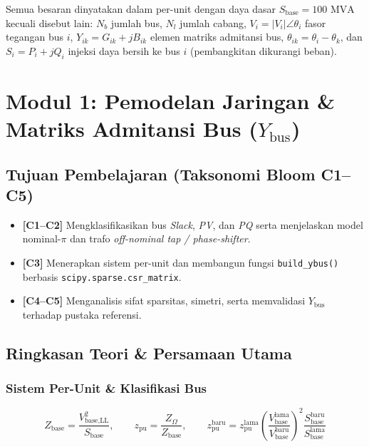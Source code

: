 \documentclass[11pt,a4paper]{report}
\begin{document}
\begin{catatanbox}
Semua besaran dinyatakan dalam per-unit dengan daya dasar $S_{\text{base}} = 100\text{ MVA}$ kecuali disebut lain: $N_b$ jumlah bus, $N_l$ jumlah cabang, $V_i = |V_i|\angle\theta_i$ fasor tegangan bus $i$, $Y_{ik} = G_{ik} + jB_{ik}$ elemen matriks admitansi bus, $\theta_{ik} = \theta_i - \theta_k$, dan $S_i = P_i + jQ_i$ injeksi daya bersih ke bus $i$ (pembangkitan dikurangi beban).
\end{catatanbox}

\chapter{Modul 1: Pemodelan Jaringan \& Matriks Admitansi Bus ($Y_{\text{bus}}$)}

\section{Tujuan Pembelajaran (Taksonomi Bloom C1--C5)}
\begin{itemize}[leftmargin=1.5em]
  \item \textbf{[C1--C2]} Mengklasifikasikan bus \textit{Slack}, \textit{PV}, dan \textit{PQ} serta menjelaskan model nominal-$\pi$ dan trafo \textit{off-nominal tap / phase-shifter}.
  \item \textbf{[C3]} Menerapkan sistem per-unit dan membangun fungsi \texttt{build\_ybus()} berbasis \texttt{scipy.sparse.csr\_matrix}.
  \item \textbf{[C4--C5]} Menganalisis sifat sparsitas, simetri, serta memvalidasi $Y_{\text{bus}}$ terhadap pustaka referensi.
\end{itemize}

\section{Ringkasan Teori \& Persamaan Utama}

\subsection{Sistem Per-Unit \& Klasifikasi Bus}
\begin{equation}
  Z_{\text{base}} = \frac{V_{\text{base,LL}}^2}{S_{\text{base}}}, \qquad
  z_{\text{pu}} = \frac{Z_{\Omega}}{Z_{\text{base}}}, \qquad
  z_{\text{pu}}^{\text{baru}} = z_{\text{pu}}^{\text{lama}}\left(\frac{V_{\text{base}}^{\text{lama}}}{V_{\text{base}}^{\text{baru}}}\right)^2\frac{S_{\text{base}}^{\text{baru}}}{S_{\text{base}}^{\text{lama}}}
\end{equation}
\end{document}
